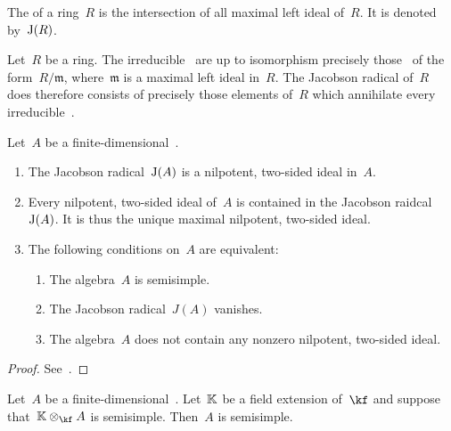 \documentclass[a4paper, 11pt, oneside]{scrartcl}
\begin{document}
\begin{definition}
  The  of a ring~$R$ is the intersection of all maximal left ideal of~$R$.
  It is denoted by~$\operatorname{J}(R)$.
\end{definition}

\begin{remark}
  Let~$R$ be a ring.
  The irreducible~ are up to isomorphism precisely those~ of the form~$R/\mathfrak{m}$, where~$\mathfrak{m}$ is a maximal left ideal in~$R$.
  The Jacobson radical of~$R$ does therefore consists of precisely those elements of~$R$ which annihilate every irreducible~.
\end{remark}

\begin{proposition}
  Let~$A$ be a finite-dimensional~\algebra{$\kf$}.
  \begin{enumerate}
    \item
      The Jacobson radical~$\operatorname{J}(A)$ is a nilpotent, two-sided ideal in~$A$.
    \item
      Every nilpotent, two-sided ideal of~$A$ is contained in the Jacobson raidcal~$\operatorname{J}(A)$.
      It is thus the unique maximal nilpotent, two-sided ideal.
    \item
      The following conditions on~$A$ are equivalent:
      \begin{enumerate}[label = \roman*.]
        \item
          The algebra~$A$ is semisimple.
        \item
          The Jacobson radical~$J(A)$ vanishes.
        \item
          The algebra~$A$ does not contain any nonzero nilpotent, two-sided ideal.
      \end{enumerate}
  \end{enumerate}
\end{proposition}

\begin{proof}
  See~\cite[\S4]{lam_first_course}.
\end{proof}

\begin{corollary}
  \label{extension of scalars for algebras reflect semisimple}
  Let~$A$ be a finite-dimensional~\algebra{$\kf$}.
  Let~$\mathbb{K}$ be a field extension of~$\kf$ and suppose that~$\Kf \tensor_{\kf} A$ is semisimple.
  Then~$A$ is semisimple.
\end{corollary}
\end{document}
